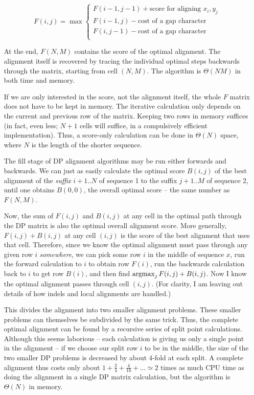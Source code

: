 \documentclass[11pt]{article}
\def\argmax{\mathop{\mathrm{argmax}}\limits}
\begin{document}
\[  F(i,j) = \max \left\{ \begin{array}{l}
                       F(i-1,j-1) + \mbox{score for aligning $x_i, y_j$} \\
                       F(i-1,j) - \mbox{cost of a gap character} \\
                       F(i,j-1) - \mbox{cost of a gap character} \\
                       \end{array} \right. \]

At the end, $F(N,M)$ contains the score of the optimal alignment. The
alignment itself is recovered by tracing the individual optimal steps
backwards through the matrix, starting from cell $(N,M)$. The
algorithm is $\Theta(NM)$ in both time and memory.

If we are only interested in the score, not the alignment itself, the
whole $F$ matrix does not have to be kept in memory. The iterative
calculation only depends on the current and previous row of the
matrix. Keeping two rows in memory suffices (in fact, even less; $N+1$
cells will suffice, in a compulsively efficient implementation). Thus,
a score-only calculation can be done in $\Theta(N)$ space, where $N$
is the length of the shorter sequence.

The fill stage of DP alignment algorithms may be run either forwards
and backwards. We can just as easily calculate the optimal score
$B(i,j)$ of the best alignment of the \emph{suffix} $i+1..N$ of
sequence 1 to the suffix $j+1..M$ of sequence 2, until one obtains
$B(0,0)$, the overall optimal score -- the same number as $F(N,M)$.

Now, the sum of $F(i,j)$ and $B(i,j)$ at any cell in the optimal path
through the DP matrix is also the optimal overall alignment score.
More generally, $F(i,j) + B(i,j)$ at any cell $(i,j)$ is the score of
the best alignment that uses that cell. Therefore, since we know the
optimal alignment must pass through any given row $i$
\emph{somewhere}, we can pick some row $i$ in the middle of sequence
$x$, run the forward calculation to $i$ to obtain row $F(i)$, run the
backwards calculation back to $i$ to get row $B(i)$, and then find
$\argmax\nolimits_j F(i,j) + B(i,j)$. Now I know the optimal alignment
passes through cell $(i,j)$. (For clarity, I am leaving out details of
how indels and local alignments are handled.)

This divides the alignment into two smaller alignment problems. These
smaller problems can themselves be subdivided by the same trick.
Thus, the complete optimal alignment can be found by a recursive
series of split point calculations. Although this seems laborious --
each calculation is giving us only a single point in the alignment --
if we choose our split row $i$ to be in the middle, the size of the
two smaller DP problems is decreased by about 4-fold at each split. A
complete alignment thus costs only about $1 + \frac{2}{4} +
\frac{4}{16} + \ldots \simeq 2$ times as much CPU time as doing the
alignment in a single DP matrix calculation, but the algorithm is
$\Theta(N)$ in memory.
\end{document}
